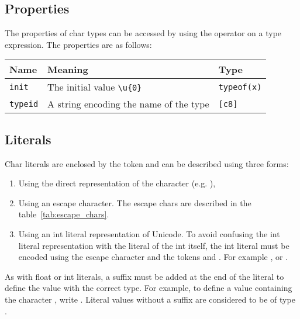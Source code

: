 \subsection{Properties}
\label{sec:orgf9fbc31}

The properties of char types can be accessed by using the \token{::} operator
on a type expression. The properties are as follows:

\begin{center}
  \begin{adjustbox}{max width=\linewidth}
    \begin{tabular}{|l|ll|}
      \hline
      Name & Meaning & Type\\[0pt]
      \hline
      \hline
      \texttt{init} & The initial value \texttt{\textbackslash{}u\{0\}} & \texttt{typeof(x)}\\[0pt]
      \hline
      \texttt{typeid} & A string encoding the name of the type & \texttt{[c8]}\\[0pt]
      \hline
    \end{tabular}
  \end{adjustbox}
\end{center}


\subsection{Literals}
\label{sec:org73c4919}

Char literals are enclosed by the token  and can be described using three forms:

\begin{enumerate}
  \setlength\itemsep{-4pt}
\item Using the direct representation of the character (e.g. ),
\item Using an escape character. The escape chars are described in the
  table~\ref{tab:escape_chars}.

\item Using an int literal representation of Unicode. To avoid confusing the int
  literal representation with the literal of the int itself, the int literal
  must be encoded using the escape character  and the
  tokens \token{\{} and \token{\}}. For example
  ,  or
  .

\end{enumerate}

As with float or int literals, a suffix must be added at the end of the literal
to define the value with the correct type. For example, to define a 
value containing the character , write . Literal values
without a suffix are considered to be of type .

